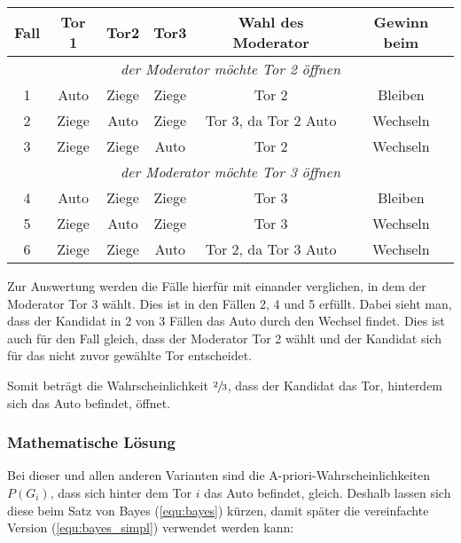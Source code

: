 \begin{tabular}[h]{|c|c|c|c|c|c|}
    \hline
    \textbf{Fall} & \textbf{Tor 1} & \textbf{Tor2} & \textbf{Tor3} & \textbf{Wahl des Moderator} & \textbf{Gewinn beim} \\
    \hline
    \multicolumn{6}{|c|}{\textit{der Moderator möchte Tor 2 öffnen} }                                                   \\
    \hline
    1             & Auto           & Ziege         & Ziege         & Tor 2                       & Bleiben              \\
    2             & Ziege          & Auto          & Ziege         & Tor 3, da Tor 2 Auto        & Wechseln             \\
    3             & Ziege          & Ziege         & Auto          & Tor 2                       & Wechseln             \\
    \hline
    \multicolumn{6}{|c|}{\textit{der Moderator möchte Tor 3 öffnen}
    }                                                                                                                   \\
    \hline
    4             & Auto           & Ziege         & Ziege         & Tor 3                       & Bleiben              \\
    5             & Ziege          & Auto          & Ziege         & Tor 3                       & Wechseln             \\
    6             & Ziege          & Ziege         & Auto          & Tor 2, da Tor 3 Auto        & Wechseln             \\
    \hline
\end{tabular}

Zur Auswertung werden die Fälle hierfür mit einander verglichen, in dem der Moderator Tor 3 wählt. Dies ist in den Fällen 2, 4 und 5 erfüllt.
Dabei sieht man, dass der Kandidat in 2 von 3 Fällen das Auto durch den Wechsel findet. Dies ist auch für den Fall gleich, dass der Moderator Tor 2 wählt und
der Kandidat sich für das nicht zuvor gewählte Tor entscheidet.

Somit beträgt die Wahrscheinlichkeit $\sfrac{2}{3}$, dass der Kandidat das Tor, hinterdem sich das Auto befindet, öffnet.

\subsubsection{Mathematische Lösung}

Bei dieser und allen anderen Varianten sind die A-priori-Wahrscheinlichkeiten $P(G_i)$, dass sich hinter dem Tor $i$ das Auto befindet, gleich. Deshalb lassen sich diese beim Satz von Bayes (\autoref{equ:bayes}) kürzen, damit später die vereinfachte Version (\autoref{equ:bayes_simpl}) verwendet werden kann:

